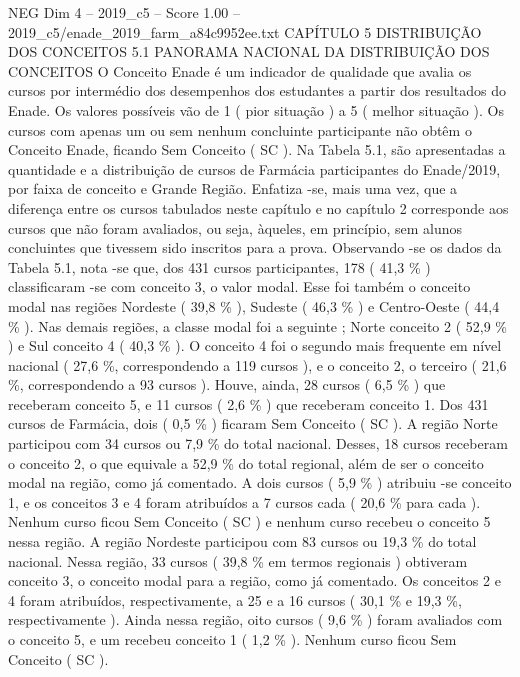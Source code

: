\begin{textsample}{NEG Dim 4 – 2019\_c5 – Score 1.00 – 2019\_c5/enade\_2019\_farm\_a84c9952ee.txt}  \label{ex:f4_neg_162}
CAPÍTULO 5 DISTRIBUIÇÃO DOS CONCEITOS 5.1 PANORAMA NACIONAL DA DISTRIBUIÇÃO DOS CONCEITOS O Conceito Enade é um indicador de qualidade que avalia os cursos por intermédio dos desempenhos dos estudantes a partir dos resultados do Enade.
Os valores possíveis vão de 1 ( pior situação ) a 5 ( melhor situação ).
Os cursos com apenas um ou sem nenhum concluinte participante não obtêm o Conceito Enade, ficando Sem Conceito ( SC ).
Na Tabela 5.1, são apresentadas a quantidade e a distribuição de cursos de Farmácia participantes do Enade/2019, por faixa de conceito e Grande Região.
Enfatiza -se, mais uma vez, que a diferença entre os cursos tabulados neste capítulo e no capítulo 2 corresponde aos cursos que não foram avaliados, ou seja, àqueles, em princípio, sem alunos concluintes que tivessem sido inscritos para a prova.
Observando -se os dados da Tabela 5.1, nota -se que, dos 431 cursos participantes, 178 ( 41,3 \% ) classificaram -se com conceito 3, o valor modal.
Esse foi também o conceito modal nas regiões Nordeste ( 39,8 \% ), Sudeste ( 46,3 \% ) e Centro-Oeste ( 44,4 \% ).
Nas demais regiões, a classe modal foi a seguinte ; Norte conceito 2 ( 52,9 \% ) e Sul conceito 4 ( 40,3 \% ).
O conceito 4 foi o segundo mais frequente em nível nacional ( 27,6 \%, correspondendo a 119 cursos ), e o conceito 2, o terceiro ( 21,6 \%, correspondendo a 93 cursos ).
Houve, ainda, 28 cursos ( 6,5 \% ) que receberam conceito 5, e 11 cursos ( 2,6 \% ) que receberam conceito 1.
Dos 431 cursos de Farmácia, dois ( 0,5 \% ) ficaram Sem Conceito ( SC ).
A região Norte participou com 34 cursos ou 7,9 \% do total nacional.
Desses, 18 cursos receberam o conceito 2, o que equivale a 52,9 \% do total regional, além de ser o conceito modal na região, como já comentado.
A dois cursos ( 5,9 \% ) atribuiu -se conceito 1, e os conceitos 3 e 4 foram atribuídos a 7 cursos cada ( 20,6 \% para cada ).
Nenhum curso ficou Sem Conceito ( SC ) e nenhum curso recebeu o conceito 5 nessa região.
A região Nordeste participou com 83 cursos ou 19,3 \% do total nacional.
Nessa região, 33 cursos ( 39,8 \% em termos regionais ) obtiveram conceito 3, o conceito modal para a região, como já comentado.
Os conceitos 2 e 4 foram atribuídos, respectivamente, a 25 e a 16 cursos ( 30,1 \% e 19,3 \%, respectivamente ).
Ainda nessa região, oito cursos ( 9,6 \% ) foram avaliados com o conceito 5, e um recebeu conceito 1 ( 1,2 \% ).
Nenhum curso ficou Sem Conceito ( SC ).

\end{textsample}
